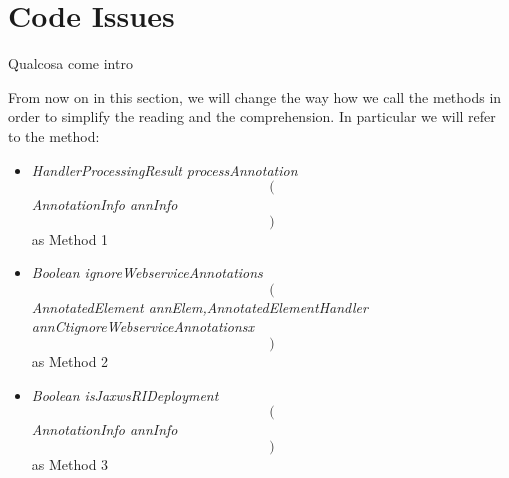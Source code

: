 \section{Code Issues}

Qualcosa come intro

From now on in this section, we will change the way how we call the methods in order to simplify the reading and the comprehension. \newline
In particular we will refer to the method:
\begin{itemize}
	\item \textit{HandlerProcessingResult processAnnotation $$($$AnnotationInfo annInfo$$)$$} as Method 1
	\item \textit{Boolean ignoreWebserviceAnnotations $$($$AnnotatedElement annElem,AnnotatedElementHandler annCtignoreWebserviceAnnotationsx$$)$$} as Method 2
	\item \textit{Boolean isJaxwsRIDeployment $$($$AnnotationInfo annInfo$$)$$} as Method 3
\end{itemize}

